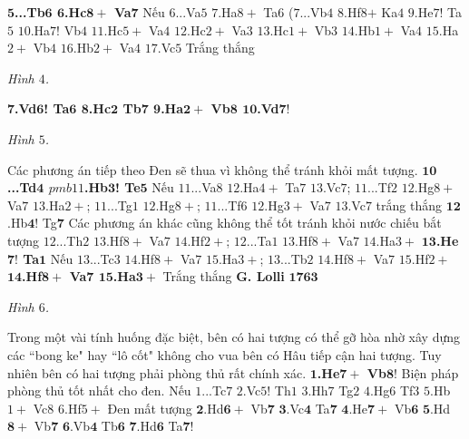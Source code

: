 \begin{multicols}{2}
	\vskip 0.1cm
	$\pmb{5}$\textbf{\color{gocco}...Tb$\pmb{6}$ $\pmb{6}$.Hc$\pmb{8+}$ Va}$\pmb{7}$ Nếu $6$...Va$5$ $7$.Ha$8+$ Ta$6$ ($7$...Vb$4$ $8$.Hf8$+$  Ka$4$ $9$.He$7!$ Ta$5$ $10$.Ha$7!$ Vb$4$ $11$.Hc$5+$ Va$4$ $12$.Hc$2+$ Va$3$ $13$.Hc$1+$ Vb$3$ $14$.Hb$1+$ Va$4$ $15$.Ha$2+$ Vb$4$ $16$.Hb$2+$ Va$4$ $17$.Vc$5$
	 \vskip 0.1cm
	Trắng thắng 
	\begin{center}
		\newgame
		\scalebox{0.95}\showboard
		\vskip 0.1cm
		\textit{\small\color{gocco}Hình $4$.}
	\end{center}
	$\pmb{7}$\textbf{\color{gocco}.Vd$\pmb{6}$! Ta$\pmb{6}$ $\pmb{8}$.Hc$\pmb{2}$ Tb$\pmb{7}$ $\pmb{9}$.Ha$\pmb{2+}$ Vb$\pmb{8}$ $\pmb{10}$.Vd}$\pmb{7!}$ 
	\begin{center}
		\newgame
		\scalebox{0.95}\showboard
		\vskip 0.1cm
		\textit{\small\color{gocco}Hình $5$.}
	\end{center}
	Các phương án tiếp theo Đen sẽ thua vì không thể tránh khỏi mất tượng.
	\vskip 0.1cm
	$\pmb{10}$\textbf{\color{gocco}...Td$\pmb{4}$ $pmb{11}$.Hb$\pmb{3}$! Te$\pmb{5}$} Nếu $11$...Va$8$ $12$.Ha$4+$ Ta$7$ $13$.Vc$7$; $11$...Tf$2$ $12$.Hg$8+$ Va$7$ $13$.Ha$2+$; $11$...Tg$1$ $12$.Hg$8+$; $11$...Tf$6$ $12$.Hg$3+$ Va$7$ $13$.Vc$7$ trắng thắng
	\vskip 0.1cm
	$\pmb{12}$.Hb$\pmb{4!}$ Tg$\pmb{7}$ Các phương án khác cũng không thể tốt tránh khỏi nước chiếu bắt tượng $12$...Th$2$ $13$.Hf$8+$ Va$7$ $14$.Hf$2+$; $12$...Ta$1$ $13$.Hf$8+$ Va$7$ $14$.Ha$3+$
	\vskip 0.1cm
	$\pmb{13}$\textbf{\color{gocco}.He$\pmb{7!}$ Ta}$\pmb{1}$  Nếu $13$...Tc$3$ $14$.Hf$8+$ Va$7$ $15$.Ha$3+$; $13$...Tb$2$ $14$.Hf$8+$ Va$7$ $15$.Hf$2+$
	\vskip 0.1cm
	$\pmb{14}$\textbf{\color{gocco}.Hf$\pmb{8+}$ Va$\pmb{7}$ $\pmb{15}$.Ha}$\pmb{3+}$ Trắng thắng
	\vskip 0.1cm
	\textbf{\color{gocco}G. Lolli} $\pmb{1763}$
	\begin{center}
		\newgame
		\scalebox{0.95}\showboard
		\vskip 0.1cm
		\textit{\small\color{gocco}Hình $6$.}
	\end{center}
	Trong một vài tính huống đặc biệt, bên có hai tượng có thể gỡ hòa nhờ xây dựng các ``bong ke" hay ``lô cốt" không cho vua bên có Hâu tiếp cận hai tượng. Tuy nhiên bên có hai tượng phải phòng thủ rất chính xác.
	\vskip 0.1cm
	$\pmb{1}$\textbf{\color{gocco}.He$\pmb{7+}$ Vb}$\pmb{8!}$ Biện pháp phòng thủ tốt nhất cho đen.
	\vskip 0.1cm
	Nếu $1$...Tc$7$ $2$.Vc$5$! Th$1$ $3$.Hh$7$ Tg$2$ $4$.Hg$6$ Tf$3$ $5$.Hb$1+$ Vc$8$ $6$.Hf$5+$ Đen mất tượng
	\vskip 0.1cm
	$\pmb{2.}$Hd$\pmb{6+}$ Vb$\pmb{7}$ $\pmb{3}$.Vc$\pmb{4}$ Ta$\pmb{7}$ $\pmb{4}$.He$\pmb{7+}$ Vb$\pmb{6}$ $\pmb{5}$.Hd$\pmb{8+}$ Vb$\pmb{7}$ $\pmb{6}$.Vb$\pmb{4}$ Tb$\pmb{6}$ $\pmb{7}$.Hd$\pmb{6}$ Ta$\pmb{7!}$

\end{multicols}

